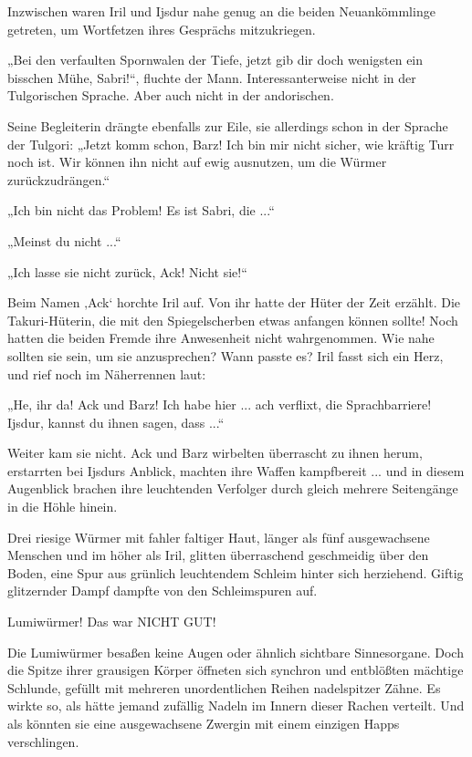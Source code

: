 Inzwischen waren Iril und Ijsdur nahe genug an die beiden Neuankömmlinge getreten, um Wortfetzen ihres Gesprächs mitzukriegen.

„Bei den verfaulten Spornwalen der Tiefe, jetzt gib dir doch wenigsten ein bisschen Mühe, Sabri!“, fluchte der Mann. Interessanterweise nicht in der Tulgorischen Sprache. Aber auch nicht in der andorischen.

Seine Begleiterin drängte ebenfalls zur Eile, sie allerdings schon in der Sprache der Tulgori: „Jetzt komm schon, Barz! Ich bin mir nicht sicher, wie kräftig Turr noch ist. Wir können ihn nicht auf ewig ausnutzen, um die Würmer zurückzudrängen.“

„Ich bin nicht das Problem! Es ist Sabri, die ...“

„Meinst du nicht ...“

„Ich lasse sie nicht zurück, Ack! Nicht sie!“

Beim Namen ‚Ack‘ horchte Iril auf. Von ihr hatte der Hüter der Zeit erzählt. Die Takuri-Hüterin, die mit den Spiegelscherben etwas anfangen können sollte! Noch hatten die beiden Fremde ihre Anwesenheit nicht wahrgenommen. Wie nahe sollten sie sein, um sie anzusprechen? Wann passte es? Iril fasst sich ein Herz, und rief noch im Näherrennen laut:

„He, ihr da! Ack und Barz! Ich habe hier ... ach verflixt, die Sprachbarriere! Ijsdur, kannst du ihnen sagen, dass ...“

Weiter kam sie nicht. Ack und Barz wirbelten überrascht zu ihnen herum, erstarrten bei Ijsdurs Anblick, machten ihre Waffen kampfbereit ... und in diesem Augenblick brachen ihre leuchtenden Verfolger durch gleich mehrere Seitengänge in die Höhle hinein.

Drei riesige Würmer mit fahler faltiger Haut, länger als fünf ausgewachsene Menschen und im höher als Iril, glitten überraschend geschmeidig über den Boden, eine Spur aus grünlich leuchtendem Schleim hinter sich herziehend. Giftig glitzernder Dampf dampfte von den Schleimspuren auf.

Lumiwürmer! Das war NICHT GUT!

Die Lumiwürmer besaßen keine Augen oder ähnlich sichtbare Sinnesorgane. Doch die Spitze ihrer grausigen Körper öffneten sich synchron und entblößten mächtige Schlunde, gefüllt mit mehreren unordentlichen Reihen nadelspitzer Zähne. Es wirkte so, als hätte jemand zufällig Nadeln im Innern dieser Rachen verteilt. Und als könnten sie eine ausgewachsene Zwergin mit einem einzigen Happs verschlingen.

